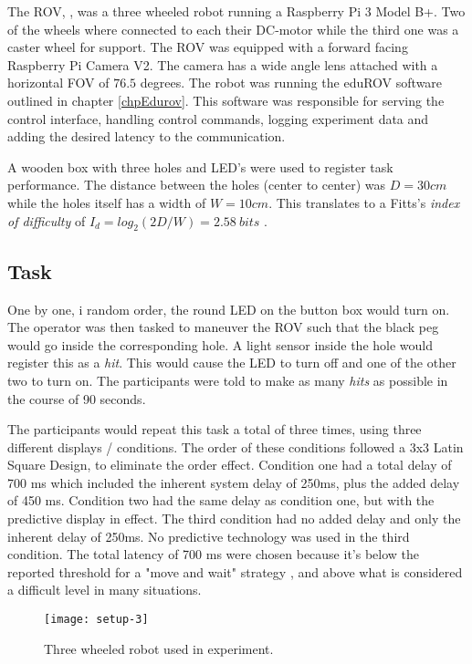 The ROV, , was a three wheeled robot running a Raspberry Pi 3 Model B+. Two of the wheels where connected to each their DC-motor while the third one was a caster wheel for support. The ROV was equipped with a forward facing Raspberry Pi Camera V2. The camera has a wide angle lens attached with a horizontal FOV of $76.5$ degrees. The robot was running the eduROV software outlined in chapter \ref{chpEdurov}. This software was responsible for serving the control interface, handling control commands, logging experiment data and adding the desired latency to the communication.

A wooden box with three holes and LED's were used to register task performance. The distance between the holes (center to center) was $D=30cm$ while the holes itself has a width of $W=10cm$. This translates to a Fitts's \emph{index of difficulty} of $I_d=log_2\left ( 2D/W \right )=2.58\: bits$ \citep{Fitts1954}.

\subsection{Task}\label{task}

One by one, i random order, the round LED on the button box would turn on. The operator was then tasked to maneuver the ROV such that the black peg would go inside the corresponding hole. A light sensor inside the hole would register this as a \emph{hit}. This would cause the LED to turn off and one of the other two to turn on. The participants were told to make as many \emph{hits} as possible in the course of 90 seconds.

The participants would repeat this task a total of three times, using three different displays / conditions. The order of these conditions followed a 3x3 Latin Square Design, to eliminate the order effect. Condition one had a total delay of 700 ms which included the inherent system delay of 250ms, plus the added delay of 450 ms. Condition two had the same delay as condition one, but with the predictive display in effect. The third condition had no added delay and only the inherent delay of 250ms. No predictive technology was used in the third condition. The total latency of 700 ms were chosen because it's below the reported threshold for a "move and wait" strategy \citep{Chen2007}, and above what is considered a difficult level in many situations.

\begin{figure}[h!]
    \centering
    \texttt{[image: setup-3]}
    \caption{Three wheeled robot used in experiment.}
    \label{setup3}
\end{figure}

